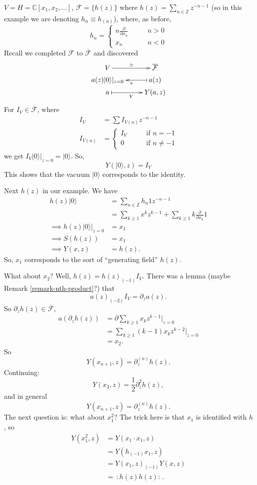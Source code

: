 \begin{example}
\label{example-Heisenberg-is-vertex-algebra-with-definition2}
$V=H=\mathbb{C}[x_1,x_2,\ldots]$, $\mathcal{F}=\{h(z)\}$ where
$h(z)=\sum_{n \in \mathbb{Z}}z^{-n-1}$ (so in this example we are denoting
$h_n \equiv h_{(n)}$), where, as before,
$$
h_n=\begin{cases}
n\frac{\partial }{\partial x_n}\qquad &n>0 \\
x_n\qquad &n<0
\end{cases}
$$
Recall we completed $\mathcal{F}$ to $\overline{\mathcal{F}}$ 
and discovered
$$
\xymatrixrowsep{0.2 em}
\xymatrix{
V\ar[r]^{\simeq}&\overline{\mathcal{F}}\\
a(z)|0\rangle |_{z=0}&a(z)\ar@{|->}[l]^s\\
a \ar@{|->}[r]_Y&Y(a,z)
}
$$
For $I_V \in \overline{\mathcal{F}}$,
where
 \begin{align*}
I_V&=\sum I_{V(n)}z^{-n-1}\\
I_{V(n)}&=\begin{cases}
I_V\qquad &\text{if }n=-1 \\
0\qquad &\text{if }n \neq -1
\end{cases}
\end{align*}
we get $I_V |0\rangle|_{z=0}=|0\rangle$. So,
$$
Y(|0\rangle,z)=I_V
$$
This shows that the vacuum $|0\rangle$ corresponds to the identity.

Next $h(z)$ in our example. We have
\begin{align*}
h(z)|0\rangle&=\sum_{ n \in \mathbb{Z}}h_n 1z^{-n-1}\\
&=\sum_{ k \geq 1}x^kz^{k-1}+\sum_{k \geq 1}k\frac{\partial }{\partial x_k}1\\
\implies h(z)|0\rangle|_{z=0}&=x_1\\
\implies S(h(z))&=x_1\\
\implies Y(x,z)&=h(z).
\end{align*}
So, $x_1$ corresponds to the sort of ``generating field'' $h(z)$.

What about $x_2$? Well, $h(z)=h(z)_{(-1)}I_V$.
There was a lemma (maybe Remark \ref{remark-nth-product}?) that
$$
a(z)_{(-2)}I_V=\partial_za(z).
$$
So $\partial_zh(z) \in \overline{\mathcal{F}}$,
\begin{align*}
a(\partial_zh(z))&=\partial \sum_{k \geq 1}x_kz^{k-1}\Big|_{z=0}\\
&=\sum_{k\geq 1}(k-1)x_kz^{k-2}\Big|_{z=0}\\
&=x_2.
\end{align*}
So
$$
Y(x_{n+1},z)=\partial_z^{(n)}h(z).
$$
Continuing:
$$
Y(x_3,z)=\frac{1}{2}\partial_z^2h(z),
$$
and in general
$$
Y(x_{n+1},z)=\partial_z^{(n)}h(z).
$$
The next question is: what about $x_1^2$? 
The trick here is that $x_1$ is identified with $h$, so
\begin{align*}
Y(x_1^2,z)&=Y(x_1\cdot x_1,z)\\
&=Y(h_{(-1)}x_1,z)\\
&=Y(x_1,z)_{(-1)}Y(x,z)\\
&=\,:\!h(z)h(z)\!:\,.
\end{align*}


\end{example}
